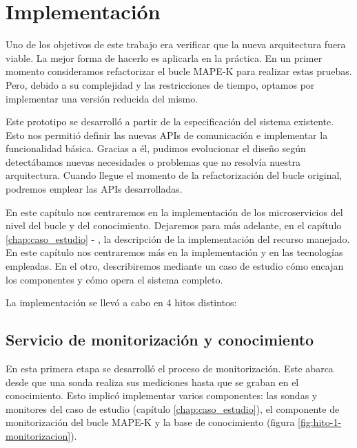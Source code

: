 \chapter{Implementación}
\label{chap:implementación}

Uno de los objetivos de este trabajo era verificar que la nueva arquitectura fuera viable. La mejor forma de hacerlo es aplicarla en la práctica. En un primer momento consideramos refactorizar el bucle MAPE-K  para realizar estas pruebas. Pero, debido a su complejidad y las restricciones de tiempo, optamos por implementar una versión reducida del mismo.

Este prototipo se desarrolló a partir de la especificación del sistema existente. Esto nos permitió definir las nuevas APIs de comunicación e implementar la funcionalidad básica. Gracias a él, pudimos evolucionar el diseño según detectábamos nuevas necesidades o problemas que no resolvía nuestra arquitectura. Cuando llegue el momento de la refactorización del bucle original, podremos emplear las APIs desarrolladas.

En este capítulo nos centraremos en la implementación de los microservicios del nivel del bucle y del conocimiento. Dejaremos para más adelante, en el capítulo \ref{chap:caso_estudio} - , la descripción de la implementación del recurso manejado. En este capítulo nos centraremos más en la implementación y en las tecnologías empleadas. En el otro, describiremos mediante un caso de estudio cómo encajan los componentes y cómo opera el sistema completo.

La implementación se llevó a cabo en 4 hitos distintos:

\section{Servicio de monitorización y conocimiento}

En esta primera etapa se desarrolló el proceso de monitorización. Este abarca desde que una sonda realiza sus mediciones hasta que se graban en el conocimiento. Esto implicó implementar varios componentes: las sondas y monitores del caso de estudio (capítulo \ref{chap:caso_estudio}), el componente de monitorización del bucle MAPE-K y la base de conocimiento (figura \ref{fig:hito-1-monitorizacion}).

